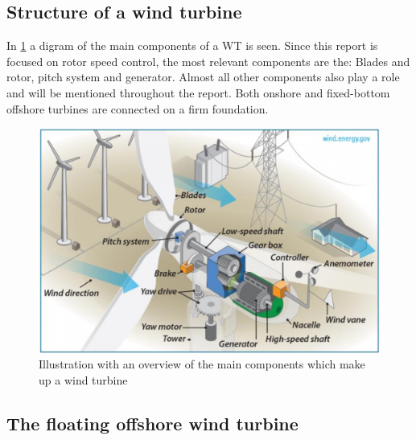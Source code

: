 \subsection{Structure of a wind turbine}
In \cref{fig:wt_components} a digram of the main components of a WT is seen. Since this report is focused on rotor speed control, the most relevant components are the: Blades and rotor, pitch system and generator. Almost all other components also play a role and will be mentioned throughout the report. Both onshore and fixed-bottom offshore turbines are connected on a firm foundation.

\begin{figure}[h]
	\centering
	\includegraphics[width=0.7\linewidth]{Graphics/WtComponents.png}
	\caption{Illustration with an overview of the main components which make up a wind turbine}
	\label{fig:wt_components}
\end{figure}

\subsection{The floating offshore wind turbine}

